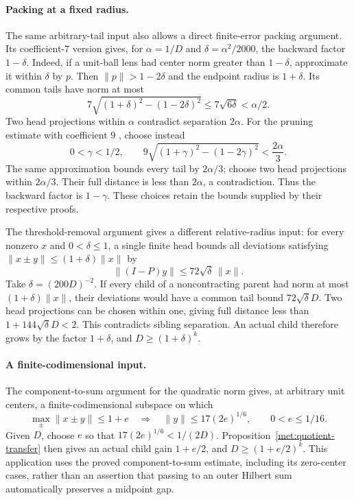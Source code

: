 \paragraph{Packing at a fixed radius.}
The same arbitrary-tail input also allows a direct finite-error packing
argument. Its coefficient-$7$ version gives, for $\alpha=1/D$ and
$\delta=\alpha^2/2000$, the backward factor $1-\delta$. Indeed, if a
unit-ball lens had center norm greater than $1-\delta$, approximate it
within $\delta$ by $p$. Then $\|p\|>1-2\delta$ and the endpoint
radius is $1+\delta$. Its common tails have norm at most
\[
 7\sqrt{(1+\delta)^2-(1-2\delta)^2}
 \le7\sqrt{6\delta}<\alpha/2.
\]
Two head projections within $\alpha$ contradict separation $2\alpha$.
For the pruning estimate with coefficient $9$
\cite[Proposition~7.12]{TreePotentials}, choose instead
\begin{equation}\label{met:pruning-parameter}
 0<\gamma<1/2,\qquad
 9\sqrt{(1+\gamma)^2-(1-2\gamma)^2}<\frac{2\alpha}{3}.
\end{equation}
The same approximation bounds every tail by $2\alpha/3$; choose two
head projections within $2\alpha/3$. Their full distance is less than
$2\alpha$, a contradiction. Thus the backward factor is $1-\gamma$.
These choices retain the bounds supplied by their respective proofs.

The threshold-removal argument \cite[Proposition~7.14]{TreePotentials}
gives a different relative-radius input:
for every nonzero $x$ and $0<\delta\le1$, a single finite
head bounds all deviations satisfying
$\|x\pm y\|\le(1+\delta)\|x\|$ by
\[
 \|(I-P)y\|\le72\sqrt\delta\,\|x\|.
\]
Take $\delta=(200D)^{-2}$. If every child of a noncontracting parent
had norm at most $(1+\delta)\|x\|$, their deviations would have a
common tail bound $72\sqrt\delta D$. Two head projections can be
chosen within one, giving full distance less than
$1+144\sqrt\delta D<2$. This contradicts sibling separation. An
actual child therefore grows by the factor $1+\delta$, and
$D\ge(1+\delta)^k$.

\paragraph{A finite-codimensional input.}
The component-to-sum argument
\cite[Lemma~7.15, Proposition~7.16 and Corollary~7.17]{TreePotentials}
for the quadratic norm gives, at arbitrary unit centers, a finite-codimensional subspace
on which
\[
 \max_\pm\|x\pm y\|\le1+e
 \quad\Longrightarrow\quad \|y\|\le17(2e)^{1/6},
 \qquad0<e\le1/16.
\]
Given $D$, choose $e$ so that $17(2e)^{1/6}<1/(2D)$.
Proposition~\ref{met:quotient-transfer} then gives an actual child gain
$1+e/2$, and $D\ge(1+e/2)^k$. This application uses the proved
component-to-sum estimate, including its zero-center cases, rather than
an assertion that passing to an outer Hilbert sum automatically
preserves a midpoint gap.

